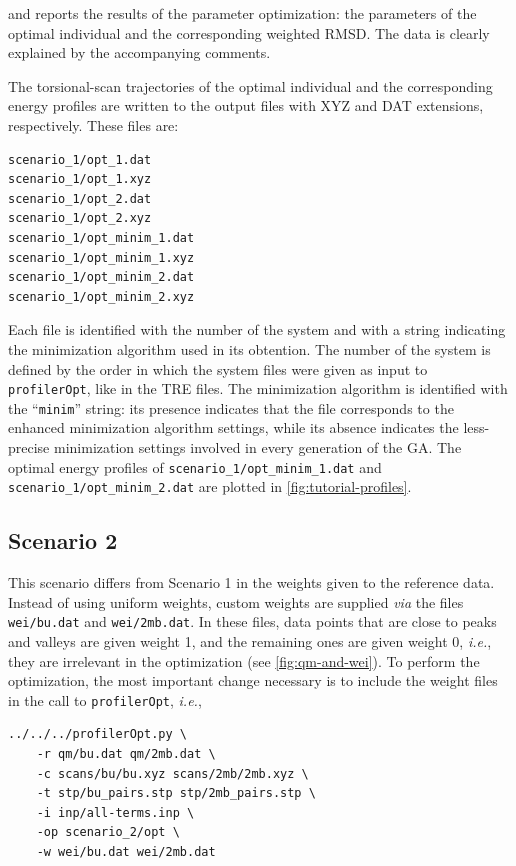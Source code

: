 \documentclass[10pt,a4paper,openany]{memoir}
\numberwithin{equation}{section}
\newcommand{\under}{\_}
\newcommand{\profileropt}[0]{\texttt{profilerOpt}}
\begin{document}
\noindent and reports the results of the parameter optimization: the
parameters of the optimal individual and the corresponding weighted
RMSD.
%
The data is clearly explained by the accompanying comments.


The torsional-scan trajectories of the optimal individual and the
corresponding energy profiles are written to the output files with XYZ
and DAT extensions, respectively.
%
These files are:

\begin{lstlisting}
scenario_1/opt_1.dat
scenario_1/opt_1.xyz
scenario_1/opt_2.dat
scenario_1/opt_2.xyz
scenario_1/opt_minim_1.dat
scenario_1/opt_minim_1.xyz
scenario_1/opt_minim_2.dat
scenario_1/opt_minim_2.xyz
\end{lstlisting}\vspace{1ex}\par
\noindent Each file is identified with the number of the system and
with a string indicating the minimization algorithm used in its
obtention.
%
The number of the system is defined by the order in which the system
files were given as input to \profileropt{}, like in the TRE files.
%
The minimization algorithm is identified with the ``\texttt{minim}''
string:
%
its presence indicates that the file corresponds to the enhanced
minimization algorithm settings, while
%
its absence indicates the less-precise minimization settings involved
in every generation of the GA.
%
The optimal energy profiles of
\texttt{scenario\under{}1/opt\under{}minim\under{}1.dat} and
\texttt{scenario\under{}1/opt\under{}minim\under{}2.dat} are plotted
in \autoref{fig:tutorial-profiles}.

\subsection{Scenario 2}
\label{sec:tutorial-scenario-2}

This scenario differs from Scenario 1 in the weights given to the
reference data.
%
Instead of using uniform weights, custom weights are supplied
\textit{via} the files \texttt{wei/bu.dat} and \texttt{wei/2mb.dat}.
%
In these files, data points that are close to peaks and valleys are
given weight 1, and the remaining ones are given weight 0,
\textit{i.e.}, they are irrelevant in the optimization (see
\autoref{fig:qm-and-wei}).
%
To perform the optimization, the most important change necessary is to
include the weight files in the call to \profileropt, \textit{i.e.},

\begin{lstlisting}
../../../profilerOpt.py \
    -r qm/bu.dat qm/2mb.dat \
    -c scans/bu/bu.xyz scans/2mb/2mb.xyz \
    -t stp/bu_pairs.stp stp/2mb_pairs.stp \
    -i inp/all-terms.inp \
    -op scenario_2/opt \
    -w wei/bu.dat wei/2mb.dat
\end{lstlisting}\vspace{1ex}\par
\end{document}
